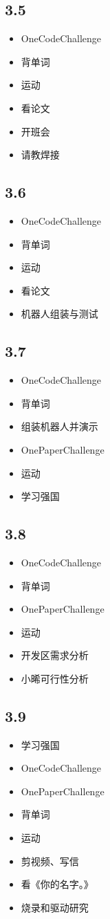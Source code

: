 \documentclass[UTF8]{ctexart}
\begin{document}
\subsection*{3.5}
\begin{itemize}
    \item OneCodeChallenge
    \item 背单词
    \item 运动
    \item 看论文
    \item 开班会
    \item 请教焊接
\end{itemize}

\subsection*{3.6}
\begin{itemize}
    \item OneCodeChallenge
    \item 背单词
    \item 运动
    \item 看论文
    \item 机器人组装与测试
\end{itemize}

\subsection*{3.7}
\begin{itemize}
    \item OneCodeChallenge
    \item 背单词
    \item 组装机器人并演示
    \item OnePaperChallenge
    \item 运动
    \item 学习强国
\end{itemize}

\subsection*{3.8}
\begin{itemize}
    \item OneCodeChallenge
    \item 背单词
    \item OnePaperChallenge
    \item 运动
    \item 开发区需求分析
    \item 小晞可行性分析
\end{itemize}

\subsection*{3.9}
\begin{itemize}
    \item 学习强国
    \item OneCodeChallenge
    \item OnePaperChallenge
    \item 背单词
    \item 运动
    \item 剪视频、写信
    \item 看《你的名字。》
    \item 烧录和驱动研究
\end{itemize}
\end{document}
